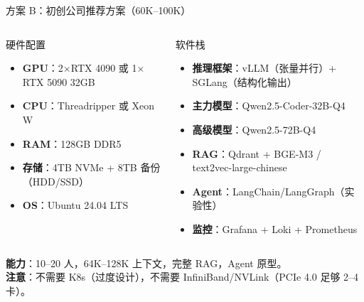 \documentclass[UTF8,11pt,aspectratio=169]{beamer}
\begin{document}
\begin{frame}{方案 B：初创公司推荐方案（\textyen{}60K--\textyen{}100K）}
  \small
  \begin{columns}[T]
    \begin{block}{硬件配置}
      \begin{itemize}
        \item \textbf{GPU}：2$\times$RTX 4090 或 1$\times$RTX 5090 32GB
        \item \textbf{CPU}：Threadripper 或 Xeon W
        \item \textbf{RAM}：128GB DDR5
        \item \textbf{存储}：4TB NVMe + 8TB 备份（HDD/SSD）
        \item \textbf{OS}：Ubuntu 24.04 LTS
      \end{itemize}
    \end{block}

    \begin{block}{软件栈}
      \begin{itemize}
        \item \textbf{推理框架}：vLLM（张量并行）+ SGLang（结构化输出）
        \item \textbf{主力模型}：Qwen2.5-Coder-32B-Q4
        \item \textbf{高级模型}：Qwen2.5-72B-Q4
        \item \textbf{RAG}：Qdrant + BGE-M3 / text2vec-large-chinese
        \item \textbf{Agent}：LangChain/LangGraph（实验性）
        \item \textbf{监控}：Grafana + Loki + Prometheus
      \end{itemize}
    \end{block}
  \end{columns}

  \vspace{0.3em}
  \textbf{能力}：10--20 人，64K--128K 上下文，完整 RAG，Agent 原型。\\
  \textbf{注意}：不需要 K8s（过度设计），不需要 InfiniBand/NVLink（PCIe 4.0 足够 2--4 卡）。
\end{frame}
\end{document}
